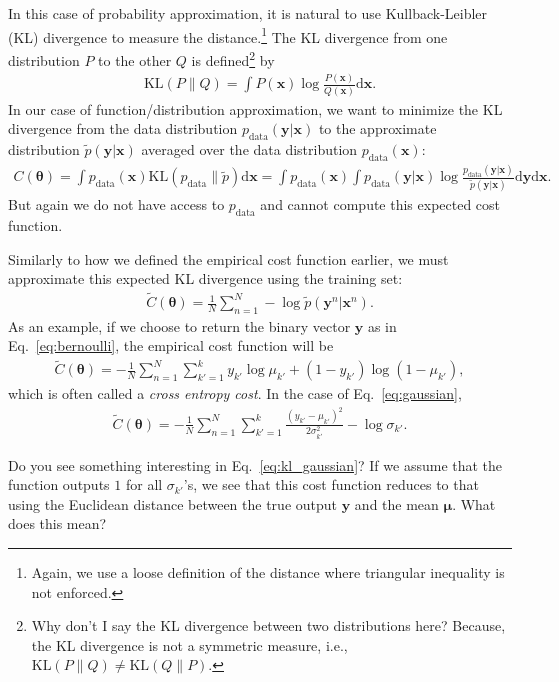 \documentclass{report}
\newcommand{\vect}[1]{\mathbf{#1}}
\newcommand{\vects}[1]{\boldsymbol{#1}}
\newcommand{\vx}[0]{\vect{x}}
\newcommand{\vy}[0]{\vect{y}}
\newcommand{\TT}[0]{\vects{\theta}}
\newcommand{\vmu}[0]{\vects{\mu}}
\newcommand{\dd}[1]{\ensuremath{\mbox{d}#1}}
\newcommand{\KL}{\text{KL}}
\newcommand{\data}{\text{data}}
\begin{document}
In this case of probability approximation, it is natural to use
Kullback-Leibler (KL) divergence to measure the distance.\footnote{
    Again, we use a loose definition of the distance where triangular inequality
    is not enforced.
} 
The KL divergence from one distribution $P$ to the other $Q$ is
defined\footnote{
    Why don't I say the KL divergence between two distributions here? Because,
    the KL divergence is not a symmetric measure, i.e., $\KL(P\|Q) \neq
    \KL(Q\|P)$.
}
by
\begin{align*}
    \KL(P\|Q) = \int P(\vx) \log \frac{P(\vx)}{Q(\vx)} \dd{\vx}.
\end{align*}
In our case of function/distribution approximation, we want to minimize the KL
divergence from the data distribution $p_{\data}(\vy|\vx)$ to the approximate
distribution $\tilde{p}(\vy | \vx)$ averaged over the data distribution
$p_{\data}(\vx)$:
\begin{align*}
    C(\TT) = \int p_{\data}(\vx) \KL(p_{\data}\|\tilde{p}) \dd{\vx} = 
    \int p_{\data}(\vx) \int p_{\data}(\vy|\vx) \log \frac{p_{\data}
    (\vy|\vx)}{\tilde{p}(\vy|\vx)} \dd{\vy} \dd{\vx}.
\end{align*}
But again we do not have access to $p_{\data}$ and cannot compute this expected
cost function.

Similarly to how we defined the empirical cost function earlier, we must
approximate this expected KL divergence using the training set: 
\begin{align}
    \label{eq:kl_train}
    \tilde{C}(\TT) = \frac{1}{N} \sum_{n=1}^N -\log \tilde{p}(\vy^n|\vx^n).
\end{align}
As an example, if we choose to return the binary vector $\vy$ as in
Eq.~\eqref{eq:bernoulli}, the empirical cost function will be
\begin{align*}
    \tilde{C}(\TT) = -\frac{1}{N} \sum_{n=1}^N 
    \sum_{k'=1}^k y_{k'} \log \mu_{k'} + (1-y_{k'}) \log (1 - \mu_{k'}),
\end{align*}
which is often called a {\em cross entropy cost}. In the case of
Eq.~\eqref{eq:gaussian}, 
\begin{align}
    \label{eq:kl_gaussian}
    \tilde{C}(\TT) = -\frac{1}{N} \sum_{n=1}^N 
    \sum_{k'=1}^k \frac{(y_{k'} - \mu_{k'})^2}{2\sigma_{k'}^2} - \log
        \sigma_{k'}.
\end{align}

Do you see something interesting in Eq.~\eqref{eq:kl_gaussian}? If we assume
that the function outputs $1$ for all $\sigma_{k'}$'s, we see that this cost
function reduces to that using the Euclidean distance between the true output
$\vy$ and the mean $\vmu$. What does this mean?
\end{document}
